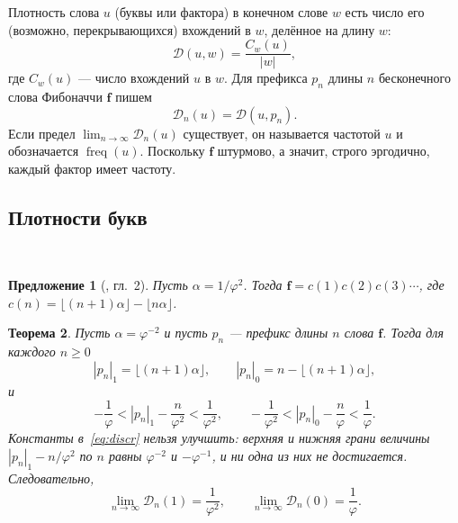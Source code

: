 \documentclass[a4paper,14pt]{extreport}
\theoremstyle{plain}
\newtheorem{theorem}{Теорема}[section]
\newtheorem{proposition}[theorem]{Предложение}
\theoremstyle{definition}
\theoremstyle{remark}
\begin{document}
Плотность слова $u$ (буквы или фактора) в конечном слове $w$ есть число его
(возможно, перекрывающихся) вхождений в $w$, делённое на длину $w$:
\begin{equation}\label{eq1densityduaa}
	\mathscr{D}(u,w)=\frac{C_w(u)}{|w|},
\end{equation}
где $C_w(u)$ --- число вхождений $u$ в $w$. Для префикса $p_n$ длины $n$ бесконечного
слова Фибоначчи $\mathbf f$ пишем
\begin{equation}\label{eq2densityduaa}
	\mathscr{D}_n(u)=\mathscr{D}(u,p_n).
\end{equation}
Если предел $\lim_{n\to\infty}\mathscr D_n(u)$ существует, он называется частотой $u$ и
обозначается $\operatorname{freq}(u)$. Поскольку $\mathbf f$ штурмово, а значит, строго эргодично, каждый фактор имеет частоту.
\subsection{Плотности букв}~\label{sec3.4.1}

\begin{proposition}[{\cite{Lothaire2002}, гл.~2}]\label{prop:mech}
	Пусть $\alpha=1/\varphi^{2}$. Тогда $\mathbf f=c(1)c(2)c(3)\cdots$, где
	$c(n)=\lfloor (n+1)\alpha\rfloor-\lfloor n\alpha\rfloor$.
\end{proposition}

\begin{theorem}\label{mainre}
	Пусть $\alpha=\varphi^{-2}$ и пусть $p_n$ --- префикс длины $n$ слова $\mathbf f$.
	Тогда для каждого $n\ge0$
	\begin{equation}\label{eq:exactcount}
		|p_n|_1=\lfloor (n+1)\alpha\rfloor,\qquad |p_n|_0=n-\lfloor (n+1)\alpha\rfloor,
	\end{equation}
	и
	\begin{equation}\label{eq:discr}
		-\frac1\varphi<|p_n|_1-\frac n{\varphi^{2}}<\frac1{\varphi^{2}},\qquad
		-\frac1{\varphi^{2}}<|p_n|_0-\frac n{\varphi}<\frac1{\varphi}.
	\end{equation}
	Константы в~\eqref{eq:discr} нельзя улучшить: верхняя и нижняя грани величины
	$|p_n|_1-n/\varphi^2$ по $n$ равны $\varphi^{-2}$ и $-\varphi^{-1}$, и ни одна из них не достигается.
	Следовательно,
	\begin{equation}
		\lim_{n\to\infty}\mathscr D_n(1)=\frac1{\varphi^{2}},\qquad
		\lim_{n\to\infty}\mathscr D_n(0)=\frac1{\varphi}.
	\end{equation}
\end{theorem}
\end{document}
